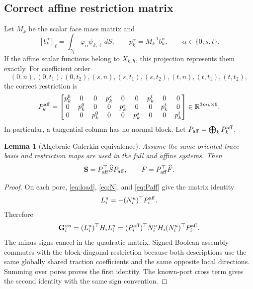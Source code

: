 \documentclass[11pt,a4paper]{article}
\newtheorem{lemma}[assumption]{Lemma}
\newcommand{\R}{\mathbb{R}}
\newcommand{\DtN}{\mathbf G}
\newcommand{\Schur}{\mathbf S}
\begin{document}
\subsection{Correct affine restriction matrix}

Let $M_k$ be the scalar face mass matrix and
\[
 [b_k^\alpha]_\ell=\int_{\gamma_k}\varphi_\alpha\psi_{k,\ell}\,dS,
 \qquad
 p_k^\alpha=M_k^{-1}b_k^\alpha,
 \qquad \alpha\in\{0,s,t\}.
\]
If the affine scalar functions belong to $X_{k,h}$, this projection represents
them exactly.  For coefficient order
\[
 (0,n),(0,t_1),(0,t_2),(s,n),(s,t_1),(s,t_2),(t,n),(t,t_1),(t,t_2),
\]
the correct restriction is
\begin{equation}\label{eq:Paff}
 P_k^{\rm aff}=
 \begin{bmatrix}
 p_k^0&0&0&p_k^s&0&0&p_k^t&0&0\\
 0&p_k^0&0&0&p_k^s&0&0&p_k^t&0\\
 0&0&p_k^0&0&0&p_k^s&0&0&p_k^t
 \end{bmatrix}\in\R^{3m_k\times9}.
\end{equation}
In particular, a tangential column has no normal block.  Let
$P_{\rm aff}=\bigoplus_kP_k^{\rm aff}$.

\begin{lemma}[Algebraic Galerkin equivalence]\label{lem:equivalence}
Assume the same oriented trace basis and restriction maps are used in the
full and affine systems.  Then
\begin{equation}\label{eq:equivalence}
 \Schur=P_{\rm aff}^\top\widehat SP_{\rm aff},
 \qquad
 F=P_{\rm aff}^\top\widehat F.
\end{equation}
\end{lemma}

\begin{proof}
On each pore, \eqref{eq:load}, \eqref{eq:N}, and \eqref{eq:Paff} give the
matrix identity
\[
 L_i^u=-(N_i^u)^\top P_i^{\rm aff}.
\]
Therefore
\[
 \DtN_i^{uu}=(L_i^u)^\top H_iL_i^u
 =(P_i^{\rm aff})^\top N_i^uH_i(N_i^u)^\top P_i^{\rm aff}.
\]
The minus signs cancel in the quadratic matrix.  Signed Boolean assembly
commutes with the block-diagonal restriction because both descriptions use
the same globally shared traction coefficients and the same opposite local
directions.  Summing over pores proves the first identity.  The known-port
cross term gives the second identity with the same sign convention.
\end{proof}
\end{document}
